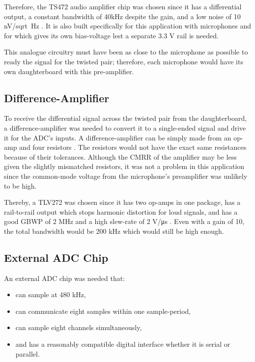 \documentclass[notitlepage]{report}
\begin{document}
Therefore, the TS472 audio amplifier chip was chosen since it has a differential output, a constant bandwidth of 40\si{kHz} despite the gain, and a low noise of 10 \si{nV/sqrt{Hz}} \cite{noauthor_very_2009}. It is also built specifically for this application with microphones and for which gives its own bias-voltage lest a separate 3.3 \si{V} rail is needed.

This analogue circuitry must have been as close to the microphone as possible to ready the signal for the twisted pair; therefore, each microphone would have its own daughterboard with this pre-amplifier.

\subsection{Difference-Amplifier}

To receive the differential signal across the twisted pair from the daughterboard, a difference-amplifier was needed to convert it to a single-ended signal and drive it for the ADC's inputs. A difference-amplifier can be simply made from an op-amp and four resistors \cite{horowitz_514_2015}. The resistors would not have the exact same resistances because of their tolerances. Although the CMRR of the amplifier may be less given the slightly mismatched resistors, it was not a problem in this application since the common-mode voltage from the microphone's preamplifier was unlikely to be high.

Thereby, a TLV272 was chosen since it has two op-amps in one package, has a rail-to-rail output which stops harmonic distortion for loud signals, and has a good GBWP of 2 \si{MHz} and a high slew-rate of 2 \si{V/\micro s} \cite{noauthor_tlv27x_2016}. Even with a gain of 10, the total bandwidth would be 200 \si{kHz} which would still be high enough.

\subsection{External ADC Chip}

An external ADC chip was needed that:
\begin{itemize}
	\item can sample at 480 \si{kHz},
	\item can communicate eight samples within one sample-period,
	\item can sample eight channels simultaneously,
	\item and has a reasonably compatible digital interface whether it is serial or parallel.
\end{itemize}
\end{document}
